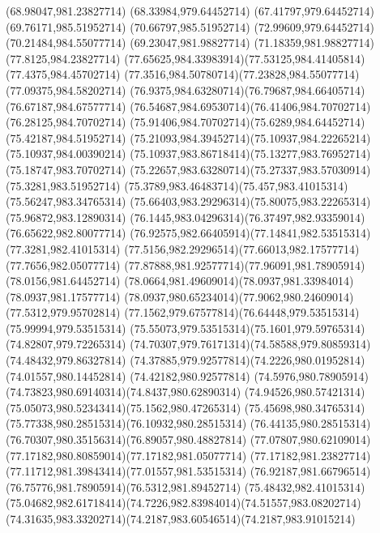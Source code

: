 {{	\lineto(68.98047,981.23827714)
	\lineto(68.33984,979.64452714)
	\lineto(67.41797,979.64452714)
	\lineto(69.76171,985.51952714)
	\lineto(70.66797,985.51952714)
	\lineto(72.99609,979.64452714)
	\closepath
	\moveto(70.21484,984.55077714)
	\lineto(69.23047,981.98827714)
	\lineto(71.18359,981.98827714)
	\closepath
	\moveto(77.8125,984.23827714)
	\curveto(77.65625,984.33983914)(77.53125,984.41405814)(77.4375,984.45702714)
	\curveto(77.3516,984.50780714)(77.23828,984.55077714)(77.09375,984.58202714)
	\curveto(76.9375,984.63280714)(76.79687,984.66405714)(76.67187,984.67577714)
	\curveto(76.54687,984.69530714)(76.41406,984.70702714)(76.28125,984.70702714)
	\curveto(75.91406,984.70702714)(75.6289,984.64452714)(75.42187,984.51952714)
	\curveto(75.21093,984.39452714)(75.10937,984.22265214)(75.10937,984.00390214)
	\curveto(75.10937,983.86718414)(75.13277,983.76952714)(75.18747,983.70702714)
	\curveto(75.22657,983.63280714)(75.27337,983.57030914)(75.3281,983.51952714)
	\curveto(75.3789,983.46483714)(75.457,983.41015314)(75.56247,983.34765314)
	\curveto(75.66403,983.29296314)(75.80075,983.22265314)(75.96872,983.12890314)
	\curveto(76.1445,983.04296314)(76.37497,982.93359014)(76.65622,982.80077714)
	\curveto(76.92575,982.66405914)(77.14841,982.53515314)(77.3281,982.41015314)
	\curveto(77.5156,982.29296514)(77.66013,982.17577714)(77.7656,982.05077714)
	\curveto(77.87888,981.92577714)(77.96091,981.78905914)(78.0156,981.64452714)
	\curveto(78.0664,981.49609014)(78.0937,981.33984014)(78.0937,981.17577714)
	\curveto(78.0937,980.65234014)(77.9062,980.24609014)(77.5312,979.95702814)
	\curveto(77.1562,979.67577814)(76.64448,979.53515314)(75.99994,979.53515314)
	\curveto(75.55073,979.53515314)(75.1601,979.59765314)(74.82807,979.72265314)
	\curveto(74.70307,979.76171314)(74.58588,979.80859314)(74.48432,979.86327814)
	\curveto(74.37885,979.92577814)(74.2226,980.01952814)(74.01557,980.14452814)
	\lineto(74.42182,980.92577814)
	\curveto(74.5976,980.78905914)(74.73823,980.69140314)(74.8437,980.62890314)
	\curveto(74.94526,980.57421314)(75.05073,980.52343414)(75.1562,980.47265314)
	\curveto(75.45698,980.34765314)(75.77338,980.28515314)(76.10932,980.28515314)
	\curveto(76.44135,980.28515314)(76.70307,980.35156314)(76.89057,980.48827814)
	\curveto(77.07807,980.62109014)(77.17182,980.80859014)(77.17182,981.05077714)
	\curveto(77.17182,981.23827714)(77.11712,981.39843414)(77.01557,981.53515314)
	\curveto(76.92187,981.66796514)(76.75776,981.78905914)(76.5312,981.89452714)
	\lineto(75.48432,982.41015314)
	\curveto(75.04682,982.61718414)(74.7226,982.83984014)(74.51557,983.08202714)
	\curveto(74.31635,983.33202714)(74.2187,983.60546514)(74.2187,983.91015214)
}}
